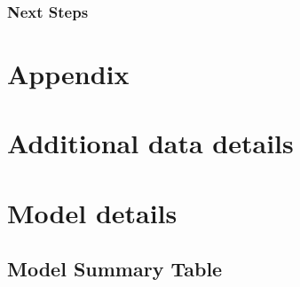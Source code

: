 \documentclass[
  letterpaper,
  DIV=11,
  numbers=noendperiod]{scrartcl}
\begin{document}
\hypertarget{next-steps}{%
\subsubsection{Next Steps}\label{next-steps}}

\newpage

\appendix

\hypertarget{appendix}{%
\section*{Appendix}\label{appendix}}

\hypertarget{additional-data-details}{%
\section{Additional data details}\label{additional-data-details}}

\hypertarget{sec-model-details}{%
\section{Model details}\label{sec-model-details}}

\hypertarget{model-summary-table}{%
\subsection{Model Summary Table}\label{model-summary-table}}
\end{document}
